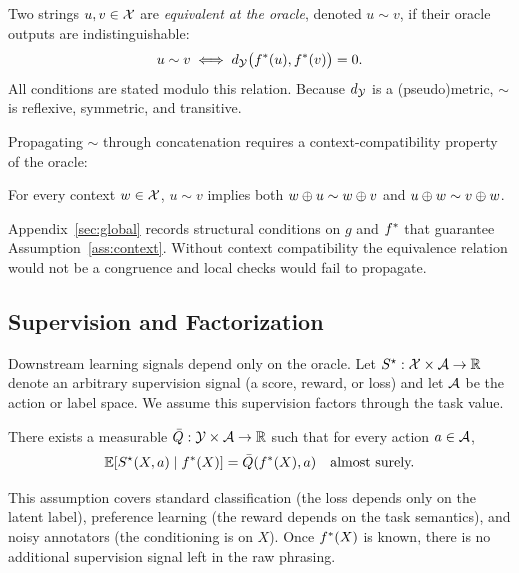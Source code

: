 Two strings $u, v \in \mathcal{X}$ are \emph{equivalent at the oracle}, denoted $u \sim v$, if their oracle outputs are indistinguishable:
\[
u \sim v \;\Longleftrightarrow\; d_{\mathcal{Y}}\big(f^{\ast}(u), f^{\ast}(v)\big) = 0.
\]
All conditions are stated modulo this relation. Because $d_{\mathcal{Y}}$ is a (pseudo)metric, $\sim$ is reflexive, symmetric, and transitive.

Propagating $\sim$ through concatenation requires a context-compatibility property of the oracle:

\begin{assumption}\label{ass:context}
For every context $w \in \mathcal{X}$, $u \sim v$ implies both $w \oplus u \sim w \oplus v$ and $u \oplus w \sim v \oplus w$.
\end{assumption}

Appendix~\ref{sec:global} records structural conditions on $g$ and $f^{\ast}$ that guarantee Assumption~\ref{ass:context}. Without context compatibility the equivalence relation would not be a congruence and local checks would fail to propagate.

\subsection{Supervision and Factorization}

Downstream learning signals depend only on the oracle. Let $S^\star: \mathcal{X} \times \mathcal{A} \to \mathbb{R}$ denote an arbitrary supervision signal (a score, reward, or loss) and let $\mathcal{A}$ be the action or label space. We assume this supervision factors through the task value.

\begin{assumption}\label{ass:CF}
There exists a measurable $\bar{Q}: \mathcal{Y} \times \mathcal{A} \to \mathbb{R}$ such that for every action $a \in \mathcal{A}$,
\[
\mathbb{E}\!\left[S^\star(X, a) \mid f^{\ast}(X)\right] = \bar{Q}(f^{\ast}(X), a) \quad \text{almost surely.}
\]
\end{assumption}

This assumption covers standard classification (the loss depends only on the latent label), preference learning (the reward depends on the task semantics), and noisy annotators (the conditioning is on $X$). Once $f^{\ast}(X)$ is known, there is no additional supervision signal left in the raw phrasing.
